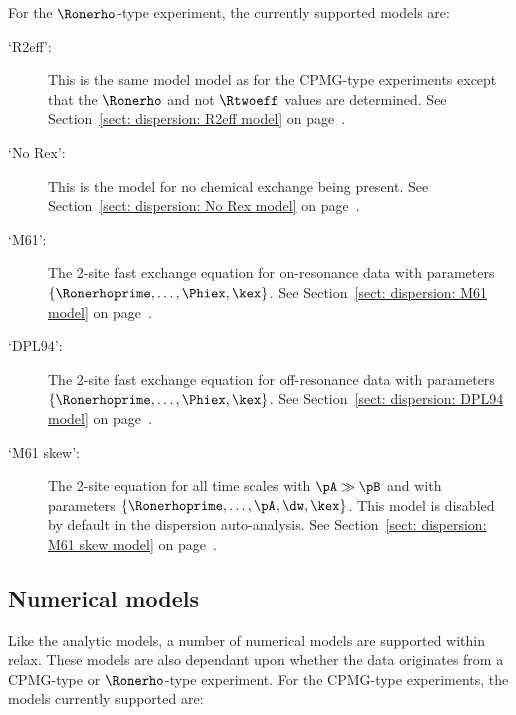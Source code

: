 For the $\Ronerho$-type experiment, the currently supported models are:

\begin{description}
\item[`R2eff':]  This is the same model model as for the CPMG-type experiments except that the $\Ronerho$ and not $\Rtwoeff$ values are determined.  See Section~\ref{sect: dispersion: R2eff model} on page~\pageref{sect: dispersion: R2eff model}.
\item[`No Rex':]  This is the model for no chemical exchange being present.  See Section~\ref{sect: dispersion: No Rex model} on page~\pageref{sect: dispersion: No Rex model}.
\item[`M61':]  The \citet{Meiboom61} 2-site fast exchange equation for on-resonance data with parameters $\{\Ronerhoprime, \dots, \Phiex, \kex\}$.  See Section~\ref{sect: dispersion: M61 model} on page~\pageref{sect: dispersion: M61 model}.
\item[`DPL94':]  The \citet{Davis94} 2-site fast exchange equation for off-resonance data with parameters $\{\Ronerhoprime, \dots, \Phiex, \kex\}$.  See Section~\ref{sect: dispersion: DPL94 model} on page~\pageref{sect: dispersion: DPL94 model}.
\item[`M61 skew':]  The \citet{Meiboom61} 2-site equation for all time scales with $\pA \gg \pB$ and with parameters $\{\Ronerhoprime, \dots, \pA, \dw, \kex\}$.  This model is disabled by default in the dispersion auto-analysis.  See Section~\ref{sect: dispersion: M61 skew model} on page~\pageref{sect: dispersion: M61 skew model}.
\end{description}




\subsection{Numerical models}
\label{sect: dispersion: numerical models}

Like the analytic models, a number of numerical models are supported within relax.
These models are also dependant upon whether the data originates from a CPMG-type or $\Ronerho$-type experiment.
For the CPMG-type experiments, the models currently supported are:

